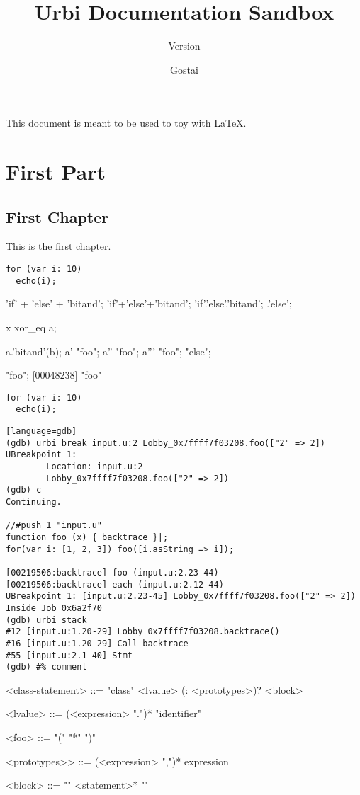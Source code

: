 \documentclass[openright,twoside,11pt]{book}
\title{Urbi Documentation Sandbox}
\subtitle{Version \VcsDescription}
\author{Gostai}
\begin{document}
\maketitle

This document is meant to be used to toy with \LaTeX{}.

\tableofcontents
\part{First Part}

\chapter{First Chapter}

This is the first chapter.

\begin{verbatim}
for (var i: 10)
  echo(i);
\end{verbatim}

\begin{urbiunchecked}
'if' + 'else' + 'bitand';
'if'+'else'+'bitand';
'if'.'else'.'bitand';
.'else';

x xor_eq a;

a.'bitand'(b);
a' "foo";
a'' "foo";
a''' "foo";
"else";

"foo";
[00048238] "foo"
\end{urbiunchecked}

\begin{verbatim}
for (var i: 10)
  echo(i);
\end{verbatim}

\begin{verbatim}[language=gdb]
(gdb) urbi break input.u:2 Lobby_0x7ffff7f03208.foo(["2" => 2])
UBreakpoint 1:
        Location: input.u:2
        Lobby_0x7ffff7f03208.foo(["2" => 2])
(gdb) c
Continuing.

//#push 1 "input.u"
function foo (x) { backtrace }|;
for(var i: [1, 2, 3]) foo([i.asString => i]);

[00219506:backtrace] foo (input.u:2.23-44)
[00219506:backtrace] each (input.u:2.12-44)
UBreakpoint 1: [input.u:2.23-45] Lobby_0x7ffff7f03208.foo(["2" => 2])
Inside Job 0x6a2f70
(gdb) urbi stack
#12 [input.u:1.20-29] Lobby_0x7ffff7f03208.backtrace()
#16 [input.u:1.20-29] Call backtrace
#55 [input.u:2.1-40] Stmt
(gdb) #% comment
\end{verbatim}

\begin{bnf}
<class-statement>
  ::= "class" <lvalue> (: <prototypes>)? <block>

<lvalue>
  ::= (<expression> ".")* "identifier"

<foo>
  ::= "(" "*" ")"

<prototypes>>
  ::= (<expression> ",")* expression

<block>
  ::= "{" <statement>* "}"
\end{bnf}
\end{document}
